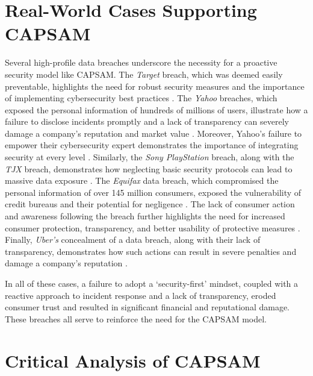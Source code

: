 \section{Real-World Cases Supporting CAPSAM}
Several high-profile data breaches underscore the necessity for a proactive security model like CAPSAM. The \textit{Target} breach, which was deemed easily preventable, highlights the need for robust security measures and the importance of implementing cybersecurity best practices \citep{shu2017breaking, manworren2016you}. The \textit{Yahoo} breaches, which exposed the personal information of hundreds of millions of users, illustrate how a failure to disclose incidents promptly and a lack of transparency can severely damage a company's reputation and market value \citep{trautman2016corporate, wang2017communication}. Moreover, Yahoo's failure to empower their cybersecurity expert demonstrates the importance of integrating security at every level \citep{trautman2016corporate}. Similarly, the \textit{Sony PlayStation} breach, along with the \textit{TJX} breach, demonstrates how neglecting basic security protocols can lead to massive data exposure \citep{fisher2013secure, bonner2012cyber}. The \textit{Equifax} data breach, which compromised the personal information of over 145 million consumers, exposed the vulnerability of credit bureaus and their potential for negligence \citep{zou2018concern, gaglione2019equifax}. The lack of consumer action and awareness following the breach further highlights the need for increased consumer protection, transparency, and better usability of protective measures \citep{zou2018concern, zou2018ve, robbins2018once}. Finally, \textit{Uber's} concealment of a data breach, along with their lack of transparency, demonstrates how such actions can result in severe penalties and damage a company's reputation \citep{paljug2020contemporary, robbins2018once}. 

In all of these cases, a failure to adopt a `security-first' mindset, coupled with a reactive approach to incident response and a lack of transparency, eroded consumer trust and resulted in significant financial and reputational damage. These breaches all serve to reinforce the need for the CAPSAM model.
    

\section{Critical Analysis of CAPSAM}
